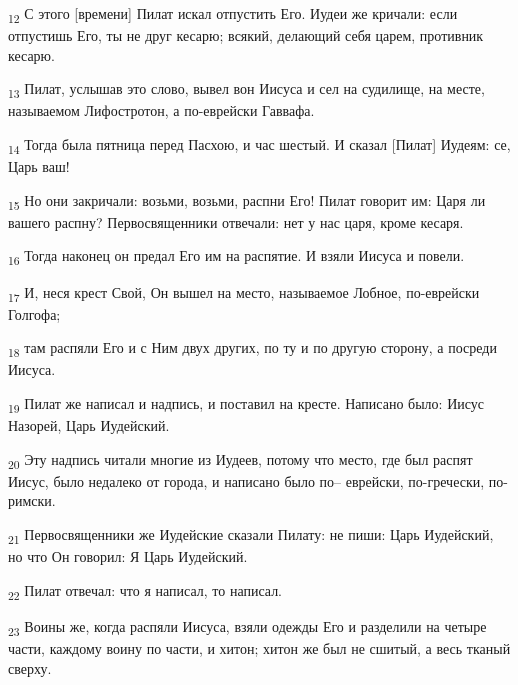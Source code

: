 \begin{tcolorbox}
\textsubscript{12} С этого [времени] Пилат искал отпустить Его. Иудеи же кричали: если отпустишь Его, ты не друг кесарю; всякий, делающий себя царем, противник кесарю.
\end{tcolorbox}
\begin{tcolorbox}
\textsubscript{13} Пилат, услышав это слово, вывел вон Иисуса и сел на судилище, на месте, называемом Лифостротон, а по-еврейски Гаввафа.
\end{tcolorbox}
\begin{tcolorbox}
\textsubscript{14} Тогда была пятница перед Пасхою, и час шестый. И сказал [Пилат] Иудеям: се, Царь ваш!
\end{tcolorbox}
\begin{tcolorbox}
\textsubscript{15} Но они закричали: возьми, возьми, распни Его! Пилат говорит им: Царя ли вашего распну? Первосвященники отвечали: нет у нас царя, кроме кесаря.
\end{tcolorbox}
\begin{tcolorbox}
\textsubscript{16} Тогда наконец он предал Его им на распятие. И взяли Иисуса и повели.
\end{tcolorbox}
\begin{tcolorbox}
\textsubscript{17} И, неся крест Свой, Он вышел на место, называемое Лобное, по-еврейски Голгофа;
\end{tcolorbox}
\begin{tcolorbox}
\textsubscript{18} там распяли Его и с Ним двух других, по ту и по другую сторону, а посреди Иисуса.
\end{tcolorbox}
\begin{tcolorbox}
\textsubscript{19} Пилат же написал и надпись, и поставил на кресте. Написано было: Иисус Назорей, Царь Иудейский.
\end{tcolorbox}
\begin{tcolorbox}
\textsubscript{20} Эту надпись читали многие из Иудеев, потому что место, где был распят Иисус, было недалеко от города, и написано было по-- еврейски, по-гречески, по-римски.
\end{tcolorbox}
\begin{tcolorbox}
\textsubscript{21} Первосвященники же Иудейские сказали Пилату: не пиши: Царь Иудейский, но что Он говорил: Я Царь Иудейский.
\end{tcolorbox}
\begin{tcolorbox}
\textsubscript{22} Пилат отвечал: что я написал, то написал.
\end{tcolorbox}
\begin{tcolorbox}
\textsubscript{23} Воины же, когда распяли Иисуса, взяли одежды Его и разделили на четыре части, каждому воину по части, и хитон; хитон же был не сшитый, а весь тканый сверху.
\end{tcolorbox}
